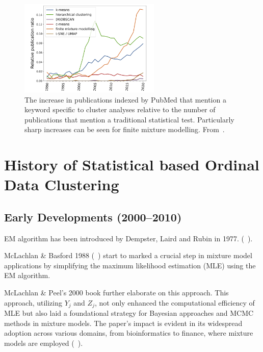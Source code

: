 \documentclass{article}
\begin{document}
\begin{figure}[ht!] %
    \centering %
    \includegraphics[width=0.6\textwidth]{images/trend.png} %
    \caption{The increase in publications indexed by PubMed that mention a keyword specific to cluster analyses relative to the number of publications 
    that mention a traditional statistical test. 
    Particularly sharp increases can be seen for finite mixture modelling.
    From~\cite{dalmaijer2022statistical}.} %
    \label{fig:trend} %
  \end{figure}


\section{History of Statistical based Ordinal Data Clustering}

\subsection*{Early Developments (2000--2010)}

EM algorithm has been introduced by Dempster, Laird and Rubin in 1977. (~\cite*[Dempster, Laird and Rubin]{Dempster1977}).

McLachlan \& Basford 1988 (~\cite{mclachlan1988mixture}) start to marked a crucial step in mixture model applications by simplifying the maximum likelihood estimation (MLE) using the EM algorithm.

McLachlan \& Peel's 2000 book further elaborate on this approach. This approach, utilizing $Y_j$ and $Z_j$, not only enhanced the computational efficiency of MLE but also laid a foundational strategy for Bayesian approaches and MCMC methods in mixture models. The paper’s impact is evident in its widespread adoption across various domains, from bioinformatics to finance, where mixture models are employed (~\cite{mclachlan2000finite}).
\end{document}
